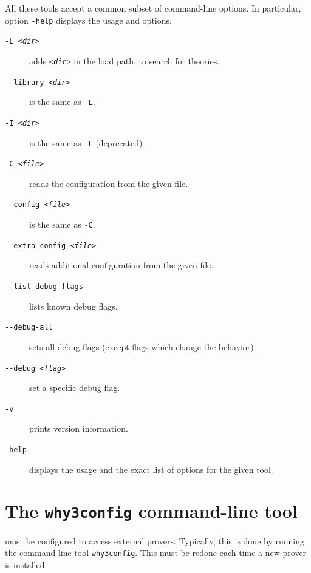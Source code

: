All these tools accept a common subset of command-line options. In
particular, option \verb|-help| displays the usage and options.
\begin{description}
\item[\texttt{-L \textsl{<dir>}}]
  adds \texttt{\textsl{<dir>}} in the load path, to search for theories.
\item[\texttt{-{}-library \textsl{<dir>}}]
  is the same as \verb|-L|.
\item[\texttt{-I \textsl{<dir>}}]
  is the same as \verb|-L| (deprecated)
\item[\texttt{-C \textsl{<file>}}]
  reads the configuration from the given file.
\item[\texttt{-{}-config \textsl{<file>}}]
  is the same as \verb|-C|.
\item[\texttt{-{}-extra-config \textsl{<file>}}]
  reads additional configuration from the given file.
\item[\texttt{-{}-list-debug-flags}]
  lists known debug flags.
\item[\texttt{-{}-debug-all}]
  sets all debug flags (except flags which change the behavior).
\item[\texttt{-{}-debug \textsl{<flag>}}]
  set a specific debug flag.
\item[\texttt{-v}]
  prints version information.
\item[\texttt{-help}]
  displays the usage and the exact list of options for the given tool.
\end{description}

\section{The \texttt{why3config} command-line tool}
\label{sec:why3config}

\why must be configured to access external provers. Typically, this is done
by running
the command line tool \texttt{why3config}.
This must be redone each time a new prover is installed.

